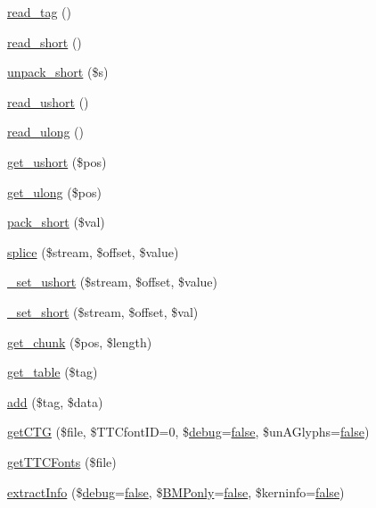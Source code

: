 \begin{DoxyCompactItemize}
\item 
\hyperlink{class_t_t_font_file_a0c35ed88ef11399fc9811dcb2f48f464}{read\-\_\-tag} ()
\item 
\hyperlink{class_t_t_font_file_a1fb108c5fc640e7b0c8921ad8bccb14e}{read\-\_\-short} ()
\item 
\hyperlink{class_t_t_font_file_aa4f950b9231065dd5e50257df5cacab4}{unpack\-\_\-short} (\$s)
\item 
\hyperlink{class_t_t_font_file_a55d2584b5de5a8e3e35b7de159a5dca7}{read\-\_\-ushort} ()
\item 
\hyperlink{class_t_t_font_file_a29fd783ac8366ddb264b716da6b253b2}{read\-\_\-ulong} ()
\item 
\hyperlink{class_t_t_font_file_acaa1a164e289b5c9dd7b384f4b619ab7}{get\-\_\-ushort} (\$pos)
\item 
\hyperlink{class_t_t_font_file_ab70b767bf655763460d459b401cbb420}{get\-\_\-ulong} (\$pos)
\item 
\hyperlink{class_t_t_font_file_ae0f569e17a0b0ffaf4b7c66690050565}{pack\-\_\-short} (\$val)
\item 
\hyperlink{class_t_t_font_file_a9a620e79b76b57c181e650b9ec7e60e2}{splice} (\$stream, \$offset, \$value)
\item 
\hyperlink{class_t_t_font_file_a50e042f571f45ed811fc03bf62e4ddcf}{\-\_\-set\-\_\-ushort} (\$stream, \$offset, \$value)
\item 
\hyperlink{class_t_t_font_file_a01d7ad62d9cd37299fb8fb5be70cf1b1}{\-\_\-set\-\_\-short} (\$stream, \$offset, \$val)
\item 
\hyperlink{class_t_t_font_file_adad126ec417da007df7dc6d1ddf8bf3c}{get\-\_\-chunk} (\$pos, \$length)
\item 
\hyperlink{class_t_t_font_file_a84442b1ec383e7ffacda018bf77f5ed6}{get\-\_\-table} (\$tag)
\item 
\hyperlink{class_t_t_font_file_aef55ab56fcf046ccf2ee7c8725a7b332}{add} (\$tag, \$data)
\item 
\hyperlink{class_t_t_font_file_ae6a92c5ae689dfacd848333656af1001}{get\-C\-T\-G} (\$file, \$T\-T\-Cfont\-I\-D=0, \$\hyperlink{font__dump_8php_a200a436f1833a712239f1ae5bec608db}{debug}=\hyperlink{ttfontsuni_8php_afbaa04e5cc97693dc668b3c45d3dd740}{false}, \$un\-A\-Glyphs=\hyperlink{ttfontsuni_8php_afbaa04e5cc97693dc668b3c45d3dd740}{false})
\item 
\hyperlink{class_t_t_font_file_ae4504e1d2fc817719e02421e7e9c692c}{get\-T\-T\-C\-Fonts} (\$file)
\item 
\hyperlink{class_t_t_font_file_a1949c4baeae1f53f68057aab7a703946}{extract\-Info} (\$\hyperlink{font__dump_8php_a200a436f1833a712239f1ae5bec608db}{debug}=\hyperlink{ttfontsuni_8php_afbaa04e5cc97693dc668b3c45d3dd740}{false}, \$\hyperlink{config__fonts_8php_a4cae730e8755c0dac19a7b97d9cdff30}{B\-M\-Ponly}=\hyperlink{ttfontsuni_8php_afbaa04e5cc97693dc668b3c45d3dd740}{false}, \$kerninfo=\hyperlink{ttfontsuni_8php_afbaa04e5cc97693dc668b3c45d3dd740}{false})

\end{DoxyCompactItemize}
